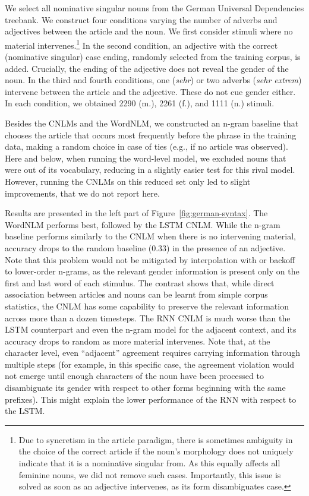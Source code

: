 We select all nominative singular nouns from the German Universal Dependencies treebank. %
We construct four conditions varying the number of adverbs and adjectives between the article and the noun.
We first consider stimuli where no material intervenes.\footnote{Due to syncretism in the article paradigm, there is sometimes ambiguity in the choice of the correct article if the noun's morphology does not uniquely indicate that it is a nominative singular from. As this equally affects all feminine nouns, we did not remove such cases. Importantly, this issue is solved as soon as an adjective intervenes, as its form disambiguates case.}
In the second condition, an adjective with the correct (nominative singular) case ending, randomly selected from the training corpus, is added.
Crucially, the ending of the adjective does not reveal the gender of the noun.
In the third and fourth conditions, one (\emph{sehr}) or two adverbs (\emph{sehr extrem}) intervene between the article and the adjective.
These do not cue gender either.
In each condition, we obtained 2290 (m.), 2261 (f.), and 1111 (n.) stimuli.

Besides the CNLMs and the WordNLM, we constructed an n-gram baseline that chooses the article that occurs most frequently before the phrase in the training data, making a random choice in case of ties (e.g., if no article was observed). Here and below, when running the word-level model, we excluded nouns that were out of its vocabulary, reducing in a slightly easier test for this rival model. However, running the CNLMs on this reduced set only led to slight improvements, that we do not report here. 

Results are presented in the left part of Figure~\ref{fig:german-syntax}. The WordNLM  performs best, followed by the LSTM CNLM.
While the n-gram baseline performs similarly to the CNLM when there is no intervening material, accuracy drops to the random baseline (0.33) in the presence of an adjective.
Note that this problem would not be mitigated by interpolation with or backoff to lower-order n-grams, as the relevant gender information is present only on the first and last word of each stimulus. The contrast shows that, while direct association between articles and nouns can be learnt from simple corpus statistics, the CNLM has some capability to preserve the relevant information across more than a dozen timesteps. The RNN CNLM is much worse than the LSTM counterpart and even the n-gram model for the adjacent context, and its accuracy drops to random as more material intervenes. Note that, at the character level, even ``adjacent'' agreement requires carrying information through multiple steps (for example, in this specific case, the agreement violation would not emerge until enough characters of the noun have been processed to disambiguate its gender with respect to other forms beginning with the same prefixes). This might explain the lower performance of the RNN with respect to the LSTM.

